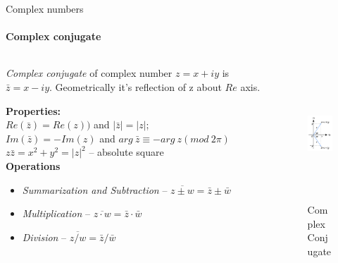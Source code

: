 \documentclass[aspectratio=169]{beamer}
\begin{document}
\begin{frame}[t]{Complex numbers}
    \framesubtitle{Complex conjugate}
    \vspace{-0.3cm}
    \begin{columns}[T,onlytextwidth]
        \begin{column}{0.7\textwidth}
            \textit{Complex conjugate} of complex number $z = x+ iy$ is ${\bar  z}=x-iy$. Geometrically it's reflection of z about $Re$ axis.

            \textbf{Properties:}\\
            $Re(\bar{z}) = Re(z))$ and $|\bar{z}| = |z|$; \\
            $Im(\bar{z}) = -Im(z)$ and $arg\ \bar{z}\equiv -arg\ z (mod\ 2\pi)$ \\
            $z\bar{z} = x^2 + y^2 = |z|^2$ -- absolute square \\
            \textbf{Operations}
            \begin{itemize}
                \item  \textit{Summarization and Subtraction} -- ${\overline {z\pm w}}={\bar {z}}\pm {\bar {w}}$
                \item \textit{Multiplication} -- ${\overline {z\cdot w}}={\bar {z}}\cdot {\bar {w}}$
                \item \textit{Division} -- ${\overline {z/w}}={\bar {z}}/{\bar {w}}$
            \end{itemize}

        \end{column}
        \begin{column}{0.29\textwidth}
            \vspace{-0.5cm}
            \begin{figure}[H]
                \centering\includegraphics[height=5cm,width=1\textwidth,keepaspectratio]{conjugate.png}
                \caption*{Complex Conjugate}
                \label{fig:conjugate.png}
            \end{figure}
        \end{column}
    \end{columns}
\end{frame}
\end{document}

